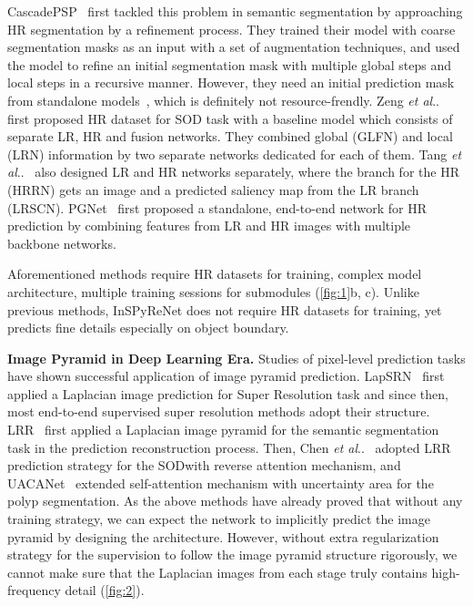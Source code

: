 \documentclass{llncs}
\makeatletter
\DeclareRobustCommand\onedot{\futurelet\@let@token\@onedot}
\def\@onedot{\ifx\@let@token.\else.\null\fi\xspace}
\def\etal{\emph{et al}\onedot}
\makeatother
\begin{document}
CascadePSP~\cite{wu2019cascaded} first tackled this problem in semantic segmentation by approaching HR segmentation by a refinement process.
They trained their model with coarse segmentation masks as an input with a set of augmentation techniques, 
and used the model to refine an initial segmentation mask with multiple global steps and local steps in a recursive manner.
However, they need an initial prediction mask from standalone models~\cite{zhao2017pyramid,chen2017rethinking}, which is definitely not resource-frendly.
Zeng \etal~\cite{zeng2019towards} first proposed HR dataset for SOD task with a baseline model which consists of separate LR, HR and fusion networks. 
They combined global (GLFN) and local (LRN) information by two separate networks dedicated for each of them.
Tang \etal~\cite{tang2021disentangled} also designed LR and HR networks separately, where the branch for the HR (HRRN) gets an image and a predicted saliency map from the LR branch (LRSCN).
PGNet~\cite{xie2022pyramid} first proposed a standalone, end-to-end network for HR prediction by combining features from LR and HR images with multiple backbone networks.

Aforementioned methods require HR datasets for training, complex model architecture, multiple training sessions for submodules (\cref{fig:1}b, c).
Unlike previous methods, InSPyReNet does not require HR datasets for training, yet predicts fine details especially on object boundary.

\noindent
\textbf{Image Pyramid in Deep Learning Era.} Studies of pixel-level prediction tasks have shown successful application of image pyramid prediction.
LapSRN~\cite{lai2017deep} first applied a Laplacian image prediction for Super Resolution task and since then, most end-to-end supervised super resolution methods adopt their structure.
LRR~\cite{ghiasi2016laplacian} first applied a Laplacian image pyramid for the semantic segmentation task in the prediction reconstruction process.
Then, Chen \etal~\cite{chen2018reverse} adopted LRR prediction strategy for the SOD\@ with reverse attention mechanism, and UACANet~\cite{kim2021uacanet} extended self-attention mechanism with uncertainty area for the polyp segmentation.
As the above methods have already proved that without any training strategy, we can expect the network to implicitly predict the image pyramid by designing the architecture.
However, without extra regularization strategy for the supervision to follow the image pyramid structure rigorously, we cannot make sure that the Laplacian images from each stage truly contains high-frequency detail (\cref{fig:2}).
\end{document}
